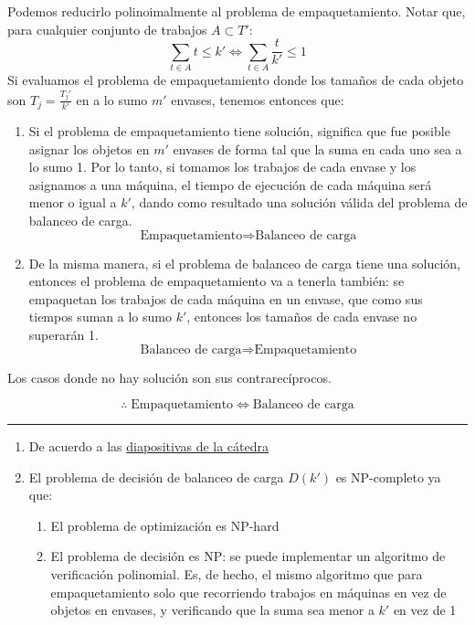 \documentclass[11pt]{article}
\providecommand{\tightlist}{%
      \setlength{\itemsep}{0pt}\setlength{\parskip}{0pt}}
\begin{document}
\begin{enumerate}
  Podemos reducirlo polinoimalmente al problema de empaquetamiento.
  Notar que, para cualquier conjunto de trabajos \(A \subset T'\):
  \[\sum_{t \in A} t \leq k' \Leftrightarrow \sum_{t \in A} \frac{t}{k'} \leq 1\]
  Si evaluamos el problema de empaquetamiento donde los tamaños de cada
  objeto son \(T_j = \frac{T_j'}{k'}\) en a lo sumo \(m'\) envases,
  tenemos entonces que:

  \begin{enumerate}
  \def\labelenumii{\arabic{enumii}.}
  \item
    Si el problema de empaquetamiento tiene solución, significa que fue
    posible asignar los objetos en \(m'\) envases de forma tal que la
    suma en cada uno sea a lo sumo 1. Por lo tanto, si tomamos los
    trabajos de cada envase y los asignamos a una máquina, el tiempo de
    ejecución de cada máquina será menor o igual a \(k'\), dando como
    resultado una solución válida del problema de balanceo de carga.
    \[\text{Empaquetamiento} \Rightarrow \text{Balanceo de carga}\]
  \item
    De la misma manera, si el problema de balanceo de carga tiene una
    solución, entonces el problema de empaquetamiento va a tenerla
    también: se empaquetan los trabajos de cada máquina en un envase,
    que como sus tiempos suman a lo sumo \(k'\), entonces los tamaños de
    cada envase no superarán 1.
    \[\text{Balanceo de carga} \Rightarrow \text{Empaquetamiento}\]
  \end{enumerate}

  Los casos donde no hay solución son sus contrarecíprocos.

  \[\therefore \; \text{Empaquetamiento} \Leftrightarrow \text{Balanceo de carga}\]
\end{enumerate}

\begin{center}\rule{0.5\linewidth}{0.5pt}\end{center}

\begin{enumerate}
\def\labelenumi{\arabic{enumi}.}
\tightlist
\item
  De acuerdo a las
  \href{https://docs.google.com/presentation/d/1m6JJo9rOFg5rjmrHq5EtqVjWz-xMNQKjPChE6MsQRTE/edit\#slide=id.g22c7a43fd5e_0_252}{diapositivas
  de la cátedra}
\item
  El problema de decisión de balanceo de carga \(D(k')\) es NP-completo
  ya que:

  \begin{enumerate}
  \def\labelenumii{\arabic{enumii}.}
  \tightlist
  \item
    El problema de optimización es NP-hard
  \item
    El problema de decisión es NP: se puede implementar un algoritmo de
    verificación polinomial. Es, de hecho, el mismo algoritmo que para
    empaquetamiento solo que recorriendo trabajos en máquinas en vez de
    objetos en envases, y verificando que la suma sea menor a \(k'\) en
    vez de 1
  \end{enumerate}
\end{enumerate}
\end{document}

